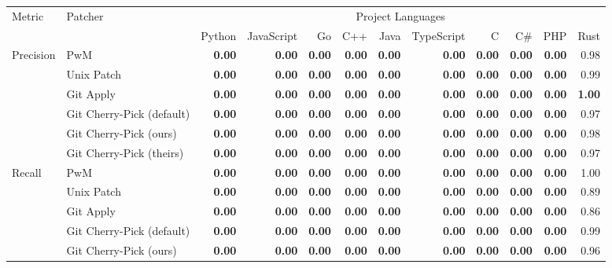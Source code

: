 \begin{tabular}{|l|l|r|r|r|r|r|r|r|r|r|r|}
\hline
Metric & Patcher & \multicolumn{10}{c|}{Project Languages} \\
\cline{3-12}
 & & Python & JavaScript & Go & C++ & Java & TypeScript & C & C\# & PHP & Rust \\
\hline
\multirow{6}{*}{Precision}
 & PwM & \textbf{0.00} & \textbf{0.00} & \textbf{0.00} & \textbf{0.00} & \textbf{0.00} & \textbf{0.00} & \textbf{0.00} & \textbf{0.00} & \textbf{0.00} & 0.98 \\
 & Unix Patch & \textbf{0.00} & \textbf{0.00} & \textbf{0.00} & \textbf{0.00} & \textbf{0.00} & \textbf{0.00} & \textbf{0.00} & \textbf{0.00} & \textbf{0.00} & 0.99 \\
 & Git Apply & \textbf{0.00} & \textbf{0.00} & \textbf{0.00} & \textbf{0.00} & \textbf{0.00} & \textbf{0.00} & \textbf{0.00} & \textbf{0.00} & \textbf{0.00} & \textbf{1.00} \\
 & Git Cherry-Pick (default) & \textbf{0.00} & \textbf{0.00} & \textbf{0.00} & \textbf{0.00} & \textbf{0.00} & \textbf{0.00} & \textbf{0.00} & \textbf{0.00} & \textbf{0.00} & 0.97 \\
 & Git Cherry-Pick (ours) & \textbf{0.00} & \textbf{0.00} & \textbf{0.00} & \textbf{0.00} & \textbf{0.00} & \textbf{0.00} & \textbf{0.00} & \textbf{0.00} & \textbf{0.00} & 0.98 \\
 & Git Cherry-Pick (theirs) & \textbf{0.00} & \textbf{0.00} & \textbf{0.00} & \textbf{0.00} & \textbf{0.00} & \textbf{0.00} & \textbf{0.00} & \textbf{0.00} & \textbf{0.00} & 0.97 \\
\hline
\multirow{6}{*}{Recall}
 & PwM & \textbf{0.00} & \textbf{0.00} & \textbf{0.00} & \textbf{0.00} & \textbf{0.00} & \textbf{0.00} & \textbf{0.00} & \textbf{0.00} & \textbf{0.00} & 1.00 \\
 & Unix Patch & \textbf{0.00} & \textbf{0.00} & \textbf{0.00} & \textbf{0.00} & \textbf{0.00} & \textbf{0.00} & \textbf{0.00} & \textbf{0.00} & \textbf{0.00} & 0.89 \\
 & Git Apply & \textbf{0.00} & \textbf{0.00} & \textbf{0.00} & \textbf{0.00} & \textbf{0.00} & \textbf{0.00} & \textbf{0.00} & \textbf{0.00} & \textbf{0.00} & 0.86 \\
 & Git Cherry-Pick (default) & \textbf{0.00} & \textbf{0.00} & \textbf{0.00} & \textbf{0.00} & \textbf{0.00} & \textbf{0.00} & \textbf{0.00} & \textbf{0.00} & \textbf{0.00} & 0.99 \\
 & Git Cherry-Pick (ours) & \textbf{0.00} & \textbf{0.00} & \textbf{0.00} & \textbf{0.00} & \textbf{0.00} & \textbf{0.00} & \textbf{0.00} & \textbf{0.00} & \textbf{0.00} & 0.96 \\

\end{tabular}
